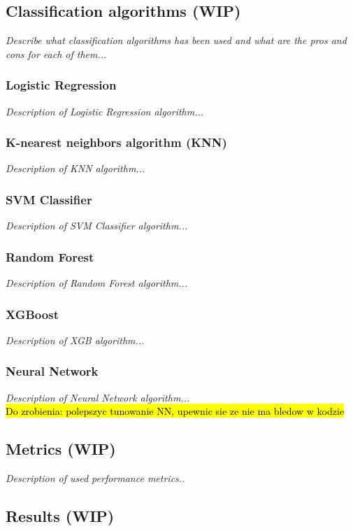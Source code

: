 \subsection{Classification algorithms (WIP)}
\textit{Describe what classification algorithms has been used and what are the pros and cons for each of them...}

\subsubsection{Logistic Regression}
\textit{Description of Logistic Regression algorithm...}

\subsubsection{K-nearest neighbors algorithm (KNN)}
\textit{Description of KNN algorithm...}

\subsubsection{SVM Classifier}
\textit{Description of SVM Classifier algorithm...}

\subsubsection{Random Forest}
\textit{Description of Random Forest algorithm...}

\subsubsection{XGBoost}
\textit{Description of XGB algorithm...}

\subsubsection{Neural Network}
\textit{Description of Neural Network algorithm...}
\\
\hl{Do zrobienia: polepszyc tunowanie NN, upewnic sie ze nie ma bledow w kodzie}

\subsection{Metrics (WIP)}
\textit{Description of used performance metrics..}



\subsection{Results (WIP)}


